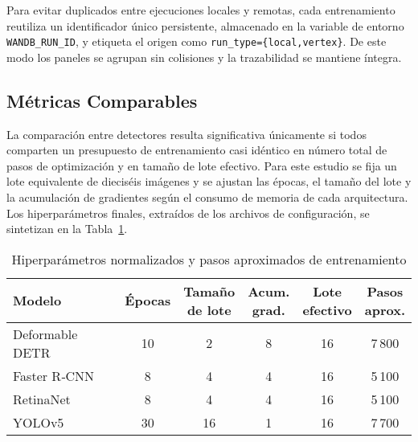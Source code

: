 Para evitar duplicados entre ejecuciones locales y remotas, cada entrenamiento reutiliza un identificador único persistente, almacenado en la variable de entorno \texttt{WANDB\_RUN\_ID}, y etiqueta el origen como \texttt{run\_type=\{local,vertex\}}.
De este modo los paneles se agrupan sin colisiones y la trazabilidad se mantiene íntegra.

\subsection{Métricas Comparables}\label{ssec:metricas}

La comparación entre detectores resulta significativa únicamente si todos comparten un presupuesto de entrenamiento casi idéntico en número total de pasos de optimización y en tamaño de lote efectivo.
Para este estudio se fija un lote equivalente de dieciséis imágenes y se ajustan las épocas, el tamaño del lote y la acumulación de gradientes según el consumo de memoria de cada arquitectura.
Los hiperparámetros finales, extraídos de los archivos de configuración, se sintetizan en la Tabla~\ref{tab:train_params}.

\begin{table}[htbp]
\centering
\caption{Hiperparámetros normalizados y pasos aproximados de entrenamiento}
\label{tab:train_params}

\setlength{\tabcolsep}{4pt}

\begin{tabular}{|p{3cm}|c|c|c|c|c|}
\hline
\textbf{Modelo}
  & \textbf{Épocas}
  & \shortstack{\textbf{Tamaño}\\\textbf{de lote}}
  & \shortstack{\textbf{Acum.}\\\textbf{grad.}}
  & \shortstack{\textbf{Lote}\\\textbf{efectivo}}
  & \shortstack{\textbf{Pasos}\\\textbf{aprox.}} \\ \hline
Deformable DETR & 10 & 2  & 8 & 16 & 7\,800 \\ \hline
Faster R‑CNN    &  8 & 4  & 4 & 16 & 5\,100 \\ \hline
RetinaNet       &  8 & 4  & 4 & 16 & 5\,100 \\ \hline
YOLOv5          & 30 & 16 & 1 & 16 & 7\,700 \\ \hline
\end{tabular}
\end{table}

